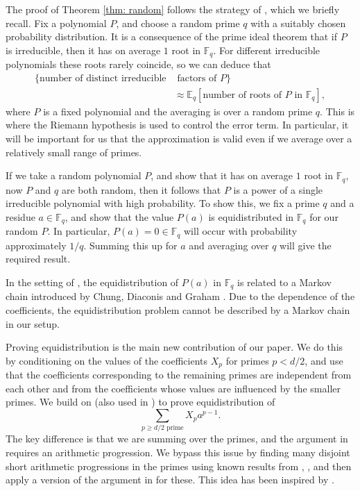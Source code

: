 \documentclass[12pt, notitlepage]{amsart}
\numberwithin{equation}{section}
\def\F{\mathbb F}
\def\E{\mathbb E}
\theoremstyle{remark}
\theoremstyle{definition}
\theoremstyle{remark}
\numberwithin{equation}{section}
\begin{document}
The proof of Theorem \ref{thm: random} follows the strategy of \cite{BV19}, which
we briefly recall.
Fix a polynomial $P$, and choose a random prime $q$ with a suitably chosen
probability distribution.
It is a consequence of the prime ideal theorem that if $P$ is irreducible, then
it has on average $1$ root in $\F_q$.
For different irreducible polynomials these roots rarely coincide, so we can
deduce that
\begin{align}\label{eq:PIT}
\{\text{number of distinct irreducible} &\text{ factors of $P$}\}\nonumber\\
&\approx \E_q[\text{number of roots of $P$ in $\F_q$}],
\end{align}
where $P$ is a fixed polynomial and the averaging is over a random prime $q$.
This is where the Riemann hypothesis is used to control the error term.
In particular, it will be important for us that the approximation is valid even if we average
over a relatively small range of primes.

If we take a random polynomial $P$, and show that it has on average
$1$ root in $\F_q$, now $P$ and $q$ are both random, then it follows
that $P$ is a power of a single irreducible polynomial with high probability.
To show this, we fix a prime $q$ and a residue $a\in\F_q$, and show that the
value $P(a)$ is equidistributed in $\F_q$ for our random $P$.
In particular, $P(a)=0\in\F_q$ will occur with probability approximately $1/q$.
Summing this up for $a$ and averaging over $q$ will give the required result. 

In the setting of \cite{BV19}, the equidistribution of $P(a)$ in $\F_q$
is related to a Markov chain introduced by Chung, Diaconis and Graham \cite{CDG87}.
Due to the dependence of the coefficients, the equidistribution problem
cannot be described by a Markov chain in our setup.
 


Proving equidistribution is the main new contribution of our paper. We do this by conditioning on the values of the coefficients $X_p$ for primes $p<d/2$, and use that the coefficients corresponding to the
remaining primes are independent from each other and from the coefficients
whose values are influenced by the smaller primes.
We build on \cite{Kon} (also used in \cite{BV19})
to prove equidistribution of
\[
\sum_{p\ge d/2\text{ prime}} X_p a^{p-1}.
\]
The key difference is that we are summing over the primes, and the argument
in \cite{BV19} requires an arithmetic progression.
We bypass this issue by finding many disjoint short arithmetic progressions
in the primes using known results from \cite{GT}, \cite{TZ}, \cite{Sha}
and then apply a version of the argument in \cite{BV19} for these.
This idea has been inspired by \cite{Bou}.
\end{document}
